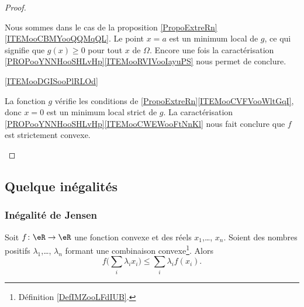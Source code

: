 \begin{proof}
\begin{subproof}
            Nous sommes dans le cas de la proposition \ref{PropoExtreRn}\ref{ITEMooCBMYooQQMqQL}. Le point \( x=a\) est un minimum local de \( g\), ce qui signifie que \( g(x)\geq 0\) pour tout \( x\) de \( \Omega\). Encore une fois la caractérisation \ref{PROPooYNNHooSHLvHp}\ref{ITEMooRVIVooIayuPS} nous permet de conclure.

        \item[\ref{ITEMooDGISooPlRLOd}]

            La fonction \( g\) vérifie les conditions de \ref{PropoExtreRn}\ref{ITEMooCVFVooWltGqI}, donc \( x=0\) est un minimum local strict de \( g\). La caractérisation \ref{PROPooYNNHooSHLvHp}\ref{ITEMooCWEWooFtNnKl} nous fait conclure que \( f\) est strictement convexe.

    \end{subproof}
\end{proof}

\subsection{Quelque inégalités}

\subsubsection{Inégalité de Jensen}

\begin{proposition}    \label{PropXIBooLxTkhU}
    Soit \( f\colon \eR\to \eR\) une fonction convexe et des réels \( x_1\),\ldots,  \( x_n\). Soient des nombres positifs \( \lambda_1\),\ldots,  \( \lambda_n\) formant une combinaison convexe\footnote{Définition \ref{DefIMZooLFdIUB}.}. Alors
    \begin{equation}
        f\big( \sum_i\lambda_ix_i \big)\leq \sum_i\lambda_if(x_i).
    \end{equation}
\end{proposition}

